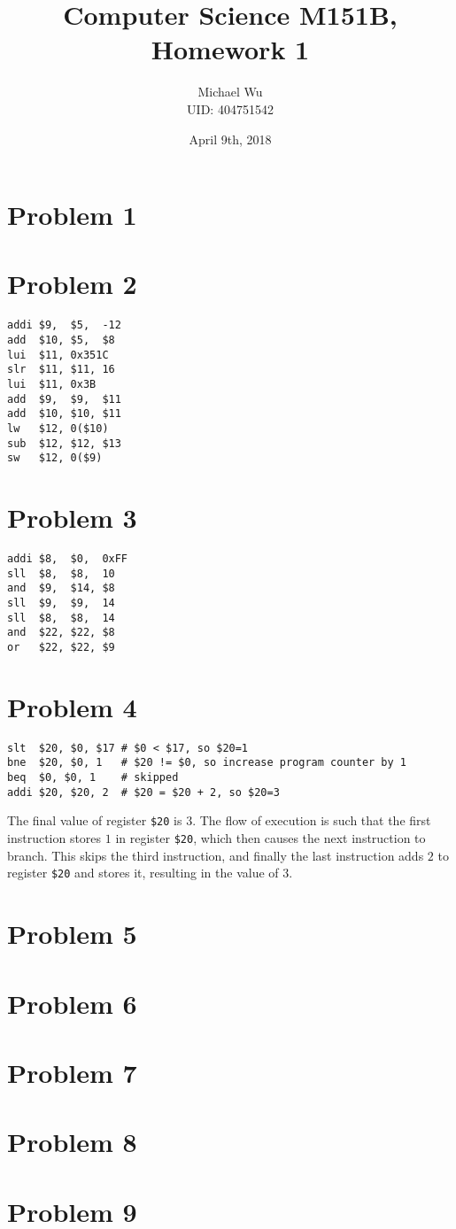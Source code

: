 \documentclass[12pt]{article}
\begin{document}
\title{Computer Science M151B, Homework 1}
\date{April 9th, 2018}
\author{Michael Wu\\UID: 404751542}
\maketitle

\section*{Problem 1}
\section*{Problem 2}

\begin{verbatim}
addi $9,  $5,  -12
add  $10, $5,  $8
lui  $11, 0x351C
slr  $11, $11, 16
lui  $11, 0x3B
add  $9,  $9,  $11
add  $10, $10, $11
lw   $12, 0($10)
sub  $12, $12, $13
sw   $12, 0($9)
\end{verbatim}

\section*{Problem 3}

\begin{verbatim}
addi $8,  $0,  0xFF
sll  $8,  $8,  10
and  $9,  $14, $8
sll  $9,  $9,  14
sll  $8,  $8,  14
and  $22, $22, $8
or   $22, $22, $9
\end{verbatim}

\section*{Problem 4}

\begin{verbatim}
slt  $20, $0, $17 # $0 < $17, so $20=1
bne  $20, $0, 1   # $20 != $0, so increase program counter by 1
beq  $0, $0, 1    # skipped
addi $20, $20, 2  # $20 = $20 + 2, so $20=3
\end{verbatim}

The final value of register \texttt{\$20} is \(3\). The flow of execution is such that the first instruction stores \(1\) in register
\texttt{\$20}, which then causes the next instruction to branch. This skips the third instruction, and finally the last instruction adds
\(2\) to register \texttt{\$20} and stores it, resulting in the value of \(3\).

\section*{Problem 5}
\section*{Problem 6}
\section*{Problem 7}
\section*{Problem 8}
\section*{Problem 9}
\end{document}
